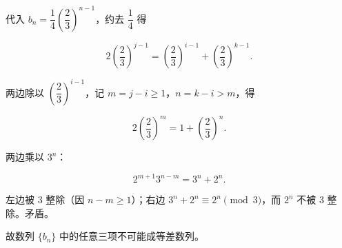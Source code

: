 \begin{answer}
代入 $b_n=\dfrac14\left(\dfrac23\right)^{n-1}$，约去 $\dfrac14$ 得

\nopagebreak[4]
\[2\left(\frac23\right)^{j-1}=\left(\frac23\right)^{i-1}+\left(\frac23\right)^{k-1}.\]

两边除以 $\left(\dfrac23\right)^{i-1}$，记 $m=j-i\geqslant1$，$n=k-i>m$，得

\nopagebreak[4]
\[2\left(\frac23\right)^{m}=1+\left(\frac23\right)^{n}.\]

两边乘以 $3^n$：

\nopagebreak[4]
\[2^{m+1}3^{n-m}=3^n+2^n. \tag{$*$}\]

左边被 $3$ 整除（因 $n-m\geqslant1$）；右边 $3^n+2^n\equiv2^n\pmod 3$，而 $2^n$ 不被 $3$ 整除。矛盾。

故数列 $\{b_n\}$ 中的任意三项不可能成等差数列。


\end{answer}
